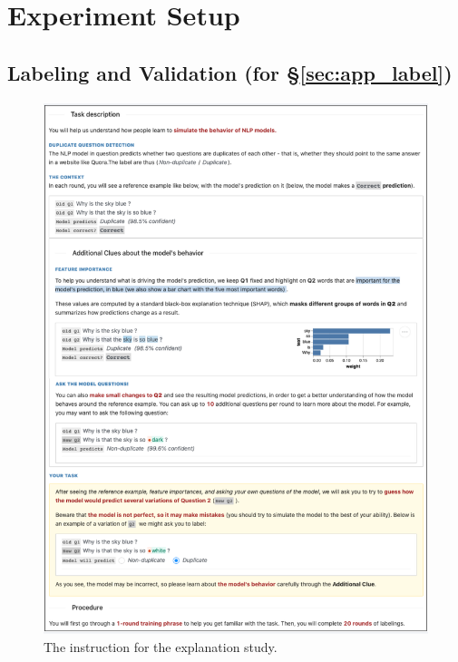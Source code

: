 \section{Experiment Setup}
\label{appendix:instruct}

\subsection{Labeling and Validation (for \S\ref{sec:app_label})}
\label{appendix:label_instruct}

\begin{figure}
\centering
\includegraphics[width=1\textwidth]{figures/explanation_instruction}
\vspace{-15pt}
\caption{The instruction for the explanation study.}
\vspace{-10pt}
\label{fig:mturk_instruction_detail}

\end{figure}


